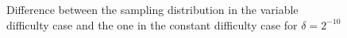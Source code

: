         \begin{figure}[ht]
          \centering
          \caption{Difference between the sampling distribution in the variable difficulty case and the one in the constant difficulty case for \(\delta=2^{-10}\)}
          \label{figure:difference}
        \end{figure}



